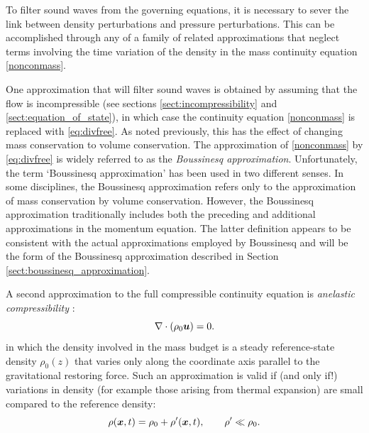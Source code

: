 To filter sound waves from the governing equations, it is necessary to sever the link between density perturbations and pressure perturbations. This can be accomplished through any of a family of related approximations that neglect terms involving the time variation of the density in the mass continuity equation \eqref{nonconmass}.

One approximation that will filter sound waves is obtained by assuming that the flow is incompressible (see sections \ref{sect:incompressibility} and \ref{sect:equation_of_state}), in which case the continuity equation \eqref{nonconmass} is replaced with \eqref{eq:divfree}. As noted previously, this has the effect of changing mass conservation to volume conservation. The approximation of \eqref{nonconmass} by \eqref{eq:divfree} is widely referred to as the \textit{Boussinesq approximation}. Unfortunately, the term `Boussinesq approximation' has been used in two different senses. In some disciplines, the Boussinesq approximation refers only to the approximation of mass conservation by volume conservation. However, the Boussinesq approximation traditionally includes both the preceding and additional approximations in the momentum equation. The latter definition appears to be consistent with the actual approximations employed by Boussinesq and will be the form of the Boussinesq approximation described in Section \ref{sect:boussinesq_approximation}.

A second approximation to the full compressible continuity equation is \textit{anelastic compressibility} \citep{ogura62}:
\begin{equation}\label{eq:anelastic}
\nabla\cdot (\rho_{0} {\mbox{\boldmath$u$}}) = 0. 
\end{equation}
in which the density involved in the mass budget is a steady reference-state density $\rho_{0}(z)$ that varies only along the coordinate axis parallel to the gravitational restoring force. Such an approximation is valid if (and only if!) variations in density (for example those arising from thermal expansion) are small compared to the reference density:
\begin{equation}\label{eq:densref}
\rho({\mbox{\boldmath$x$}},t) = \rho_0 + \rho'({\mbox{\boldmath$x$}},t),\qquad \rho'\ll\rho_0.
\end{equation}

